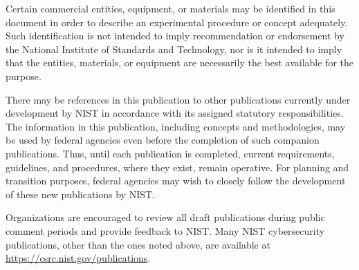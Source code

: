 \pagestyle{empty}

	\tagstructend %



\titleformat{\section}{\normalsize\bfseries\sffamily}{}{0em}{}
\titleformat{\subsection}{\normalsize\bfseries\sffamily}{}{0em}{}
\titleformat{\subsubsection}{\normalsize\bfseries\sffamily}{}{0em}{}
\titleformat{\paragraph}{\normalsize\bfseries\sffamily}{}{0em}{}

Certain commercial entities, equipment, or materials may be identified in this document in order to describe an experimental procedure or concept adequately. Such identification is not intended to imply recommendation or endorsement by the National Institute of Standards and Technology, nor is it intended to imply that the entities, materials, or equipment are necessarily the best available for the purpose. 

There may be references in this publication to other publications currently under development by NIST in accordance with its assigned statutory responsibilities. The information in this publication, including concepts and methodologies, may be used by federal agencies even before the completion of such companion publications. Thus, until each publication is completed, current requirements, guidelines, and procedures, where they exist, remain operative. For planning and transition purposes, federal agencies may wish to closely follow the development of these new publications by NIST.  

Organizations are encouraged to review all draft publications during public comment periods and provide feedback to NIST. Many NIST cybersecurity publications, other than the ones noted above, are available at \url{https://csrc.nist.gov/publications}.


